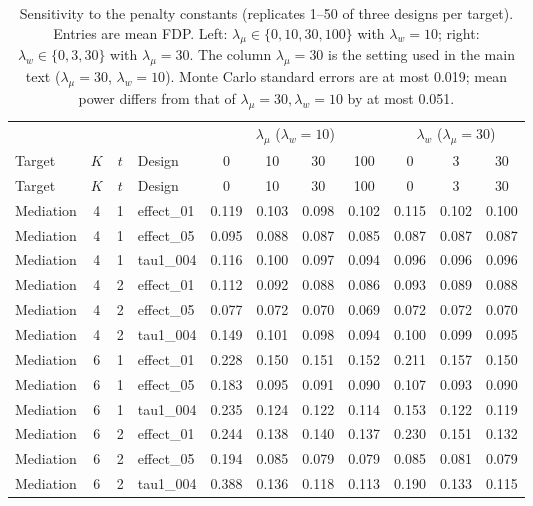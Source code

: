{\footnotesize\setlength{\tabcolsep}{4pt}
\begin{longtable}{lccl cccc ccc}
\caption{Sensitivity to the penalty constants (replicates 1--50 of three designs per target). Entries are mean FDP. Left: $\lambda_\mu\in\{0,10,30,100\}$ with $\lambda_w=10$; right: $\lambda_w\in\{0,3,30\}$ with $\lambda_\mu=30$. The column $\lambda_\mu=30$ is the setting used in the main text ($\lambda_\mu=30$, $\lambda_w=10$). Monte Carlo standard errors are at most 0.019; mean power differs from that of $\lambda_\mu=30,\lambda_w=10$ by at most 0.051.}\label{tab:penalty-choice}\\
\toprule
 & & & & \multicolumn{4}{c}{$\lambda_\mu$ ($\lambda_w=10$)} & \multicolumn{3}{c}{$\lambda_w$ ($\lambda_\mu=30$)}\\
\cmidrule(lr){5-8}\cmidrule(lr){9-11}
Target & $K$ & $t$ & Design & 0 & 10 & 30 & 100 & 0 & 3 & 30\\
\midrule
\endfirsthead
\toprule
Target & $K$ & $t$ & Design & 0 & 10 & 30 & 100 & 0 & 3 & 30\\
\midrule
\endhead
\bottomrule
\endfoot
Mediation & 4 & 1 & effect\_01 & 0.119 & 0.103 & 0.098 & 0.102 & 0.115 & 0.102 & 0.100\\
Mediation & 4 & 1 & effect\_05 & 0.095 & 0.088 & 0.087 & 0.085 & 0.087 & 0.087 & 0.087\\
Mediation & 4 & 1 & tau1\_004 & 0.116 & 0.100 & 0.097 & 0.094 & 0.096 & 0.096 & 0.096\\
Mediation & 4 & 2 & effect\_01 & 0.112 & 0.092 & 0.088 & 0.086 & 0.093 & 0.089 & 0.088\\
Mediation & 4 & 2 & effect\_05 & 0.077 & 0.072 & 0.070 & 0.069 & 0.072 & 0.072 & 0.070\\
Mediation & 4 & 2 & tau1\_004 & 0.149 & 0.101 & 0.098 & 0.094 & 0.100 & 0.099 & 0.095\\
Mediation & 6 & 1 & effect\_01 & 0.228 & 0.150 & 0.151 & 0.152 & 0.211 & 0.157 & 0.150\\
Mediation & 6 & 1 & effect\_05 & 0.183 & 0.095 & 0.091 & 0.090 & 0.107 & 0.093 & 0.090\\
Mediation & 6 & 1 & tau1\_004 & 0.235 & 0.124 & 0.122 & 0.114 & 0.153 & 0.122 & 0.119\\
Mediation & 6 & 2 & effect\_01 & 0.244 & 0.138 & 0.140 & 0.137 & 0.230 & 0.151 & 0.132\\
Mediation & 6 & 2 & effect\_05 & 0.194 & 0.085 & 0.079 & 0.079 & 0.085 & 0.081 & 0.079\\
Mediation & 6 & 2 & tau1\_004 & 0.388 & 0.136 & 0.118 & 0.113 & 0.190 & 0.133 & 0.115\\

\end{longtable}}
